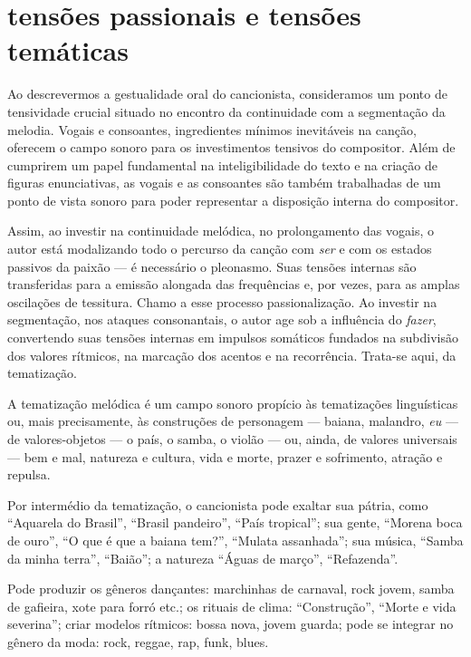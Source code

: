\section{tensões passionais e tensões temáticas}

Ao descrevermos a gestualidade oral do cancionista, consideramos um
ponto de tensividade crucial situado no encontro da continuidade com a
segmentação da melodia. Vogais e consoantes, ingredientes mínimos
inevitáveis na canção, oferecem o campo sonoro para os investimentos
tensivos do compositor. Além de cumprirem um papel fundamental na
inteligibilidade do texto e na criação de figuras enunciativas, as
vogais e as consoantes são também trabalhadas de um ponto de vista
sonoro para poder representar a disposição interna do compositor.

Assim, ao investir na continuidade melódica, no prolongamento das
vogais, o autor está modalizando todo o percurso da canção com \textit{ser} e
com os estados passivos da paixão --- é necessário o pleonasmo. Suas
tensões internas são transferidas para a emissão alongada das
frequências e, por vezes, para as amplas oscilações de tessitura. Chamo
a esse processo passionalização. Ao investir na segmentação, nos ataques
consonantais, o autor age sob a influência do \textit{fazer}, convertendo suas
tensões internas em impulsos somáticos fundados na subdivisão dos
valores rítmicos, na marcação dos acentos e na recorrência. Trata-se
aqui, da tematização.

A tematização melódica é um campo sonoro propício às tematizações
linguísticas ou, mais precisamente, às construções de personagem --- baiana, malandro, \textit{eu} --- de valores-objetos --- o país, o samba, o violão --- ou, ainda, de valores universais --- bem e mal, natureza e cultura, vida e morte, prazer e sofrimento, atração e repulsa. 

Por intermédio da tematização, o cancionista pode exaltar sua pátria, como ``Aquarela do Brasil'', ``Brasil
pandeiro'', ``País tropical''; sua gente, ``Morena boca de ouro'', ``O que é que a
baiana tem?'', ``Mulata assanhada''; sua música, ``Samba da minha terra'',
``Baião''; a natureza ``Águas de março'', ``Refazenda''. 

Pode produzir os gêneros dançantes: marchinhas de carnaval, rock jovem, samba de gafieira, xote
para forró etc.; os rituais de clima: ``Construção'', ``Morte e vida
severina''; criar modelos rítmicos: bossa nova, jovem guarda; pode
se integrar no gênero da moda: rock, reggae, rap, funk, blues. 

